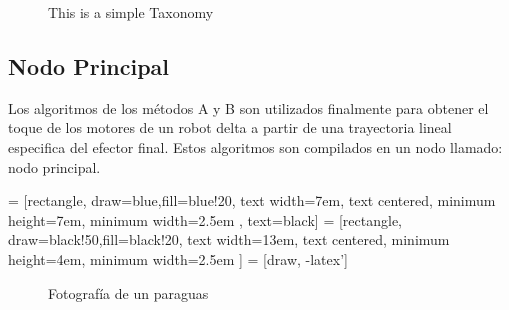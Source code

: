 \begin{center}
\begin{figure}[H]
            
                \caption{This is a simple Taxonomy}
                \label{fig:my_label}
        \end{figure}
 \end{center}
   
    \newpage
    
    \subsection{Nodo Principal}
    Los algoritmos de los métodos A y B son utilizados finalmente para obtener el toque de los motores de un robot delta a partir de una trayectoria lineal especifica del efector final. Estos algoritmos son compilados en un nodo llamado: nodo principal. 
    
         = [rectangle, draw=blue,fill=blue!20, text width=7em, text centered, minimum height=7em, minimum width=2.5em , text=black]
         = [rectangle, draw=black!50,fill=black!20, text width=13em, text centered, minimum height=4em, minimum width=2.5em ]
         = [draw, -latex']
         \begin{center}
         \begin{figure}[htb]
                \caption{Fotografía de un paraguas}
                \label{f:Cap6_funtion_1}
         \end{figure}
         \end{center}
         
